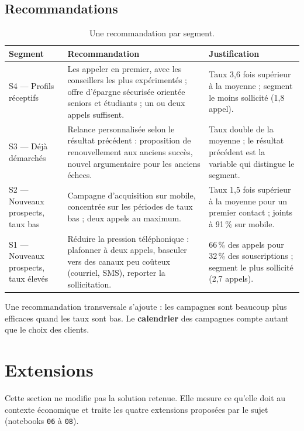 \documentclass[11pt,a4paper]{article}
\begin{document}
\subsection{Recommandations}
\begin{table}[H]\centering\small
\caption{Une recommandation par segment.}\label{tab:reco}
\begin{tabularx}{\textwidth}{|L{2.6cm}|Y|Y|}
\hline
\textbf{Segment} & \textbf{Recommandation} & \textbf{Justification}\\ \hline
S4 --- Profils réceptifs & Les appeler en premier, avec les conseillers les plus expérimentés ; offre d'épargne sécurisée orientée seniors et étudiants ; un ou deux appels suffisent. & Taux 3,6 fois supérieur à la moyenne ; segment le moins sollicité (1,8 appel).\\ \hline
S3 --- Déjà démarchés & Relance personnalisée selon le résultat précédent : proposition de renouvellement aux anciens succès, nouvel argumentaire pour les anciens échecs. & Taux double de la moyenne ; le résultat précédent est la variable qui distingue le segment.\\ \hline
S2 --- Nouveaux prospects, taux bas & Campagne d'acquisition sur mobile, concentrée sur les périodes de taux bas ; deux appels au maximum. & Taux 1,5 fois supérieur à la moyenne pour un premier contact ; joints à 91\,\% sur mobile.\\ \hline
S1 --- Nouveaux prospects, taux élevés & Réduire la pression téléphonique : plafonner à deux appels, basculer vers des canaux peu coûteux (courriel, SMS), reporter la sollicitation. & 66\,\% des appels pour 32\,\% des souscriptions ; segment le plus sollicité (2,7 appels).\\ \hline
\end{tabularx}
\end{table}

Une recommandation transversale s'ajoute : les campagnes sont beaucoup plus efficaces quand les taux sont bas. Le \textbf{calendrier} des campagnes compte autant que le choix des clients.

\section{Extensions}\label{sec:extensions}

Cette section ne modifie pas la solution retenue. Elle mesure ce qu'elle doit au contexte économique et traite les quatre extensions proposées par le sujet (notebooks \texttt{06} à \texttt{08}).
\end{document}

